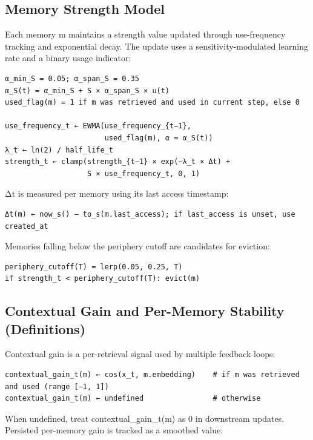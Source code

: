 \documentclass[
  letterpaper,
  DIV=11,
  numbers=noendperiod]{scrartcl}
\begin{document}
\subsection{Memory Strength Model}\label{sec-memory-strength}

Each memory m maintains a strength value updated through use-frequency
tracking and exponential decay. The update uses a sensitivity-modulated
learning rate and a binary usage indicator:

\begin{verbatim}
α_min_S = 0.05; α_span_S = 0.35
α_S(t) = α_min_S + S × α_span_S × u(t)
used_flag(m) = 1 if m was retrieved and used in current step, else 0

use_frequency_t ← EWMA(use_frequency_{t−1},
                       used_flag(m), α = α_S(t))
λ_t ← ln(2) / half_life_t
strength_t ← clamp(strength_{t−1} × exp(−λ_t × Δt) +
                   S × use_frequency_t, 0, 1)
\end{verbatim}

Δt is measured per memory using its last access timestamp:

\begin{verbatim}
Δt(m) ← now_s() − to_s(m.last_access); if last_access is unset, use created_at
\end{verbatim}

Memories falling below the periphery cutoff are candidates for eviction:

\begin{verbatim}
periphery_cutoff(T) = lerp(0.05, 0.25, T)
if strength_t < periphery_cutoff(T): evict(m)
\end{verbatim}

\subsection{Contextual Gain and Per-Memory Stability
(Definitions)}\label{contextual-gain-and-per-memory-stability-definitions}

Contextual gain is a per-retrieval signal used by multiple feedback
loops:

\begin{verbatim}
contextual_gain_t(m) ← cos(x_t, m.embedding)    # if m was retrieved and used (range [−1, 1])
contextual_gain_t(m) ← undefined                # otherwise
\end{verbatim}

When undefined, treat contextual\_gain\_t(m) as 0 in downstream updates.
Persisted per-memory gain is tracked as a smoothed value:
\end{document}

